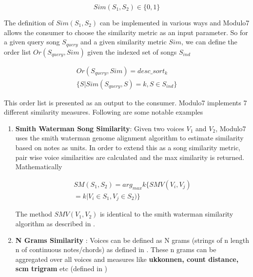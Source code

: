 \documentclass{article}
\begin{document}
\begin{equation}
Sim(S_1, S_2) \in \{0, 1\}
\end{equation}

\noindent The definition of $Sim(S_1, S_2)$ can be implemented in various ways and Modulo7 allows the consumer to choose the similarity metric as an input parameter. So for a given query song $S_{query}$ and a given similarity metric $Sim$, we can define the order list $Or(S_{query}, Sim)$ given the indexed set of songs $S_{ind}$

\begin{equation}
\begin{aligned}
Or(S_{query}, Sim) =  desc\_sort_k \\ \{S | Sim(S_{query}, S) = k, S \in S_{ind}\}
\end{aligned}
\end{equation}

\noindent This order list is presented as an output to the consumer. Modulo7 implements 7 different similarity measures. Following are some notable examples

\begin{enumerate}
\item \textbf{Smith Waterman Song Similarity}: Given two voices $V_1$ and $V_2$, Modulo7 uses the smith waterman genome alignment algorithm \cite{smithwatermanmusic} to estimate similarity based on notes as units. In order to extend this as a song similarity metric, pair wise voice similarities are calculated and the max similarity is returned. Mathematically 

\begin{equation}
\begin{aligned}
SM(S_1, S_2) = arg_{max} k \{SMV(V_i, V_j) \\ = k | V_i \in S_1, V_j \in S_2)\}
\end{aligned}
\end{equation}

The method $SMV(V_1, V_2)$ is identical to the smith waterman similarity algorithm as described in \cite{smithwatermanmusic}. 

\item \textbf{N Grams Similarity }: Voices can be defined as N grams (strings of n length n of continuous notes/chords) as defined in \cite{similie}. These n grams can be aggregated over all voices and measures like \textbf{ukkonnen, count distance, scm trigram} etc (defined in \cite{similietechnicalmanual})
\end{enumerate}
\end{document}
